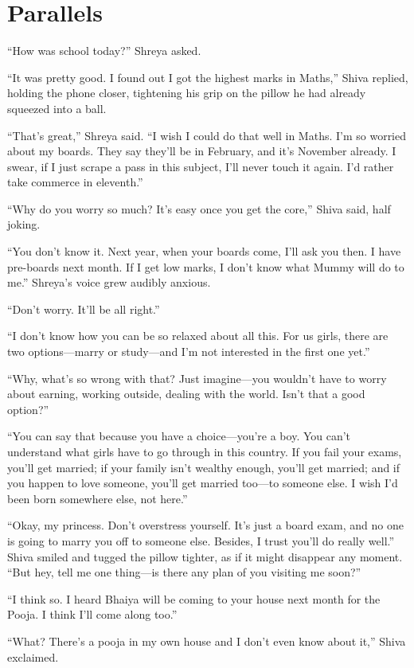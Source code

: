 \chapter{Parallels}
``How was school today?'' Shreya asked.

``It was pretty good. I found out I got the highest marks in Maths,'' Shiva replied, holding the phone closer, tightening his grip on the pillow he had already squeezed into a ball.

``That's great,'' Shreya said. ``I wish I could do that well in Maths. I'm so worried about my boards. They say they'll be in February, and it's November already. I swear, if I just scrape a pass in this subject, I'll never touch it again. I'd rather take commerce in eleventh.''

``Why do you worry so much? It's easy once you get the core,'' Shiva said, half joking.

``You don't know it. Next year, when your boards come, I'll ask you then. I have pre-boards next month. If I get low marks, I don't know what Mummy will do to me.'' Shreya's voice grew audibly anxious.

``Don't worry. It'll be all right.''

``I don't know how you can be so relaxed about all this. For us girls, there are two options—marry or study—and I'm not interested in the first one yet.''

``Why, what's so wrong with that? Just imagine—you wouldn't have to worry about earning, working outside, dealing with the world. Isn't that a good option?''

``You can say that because you have a choice—you're a boy. You can't understand what girls have to go through in this country. If you fail your exams, you'll get married; if your family isn't wealthy enough, you'll get married; and if you happen to love someone, you'll get married too—to someone else. I wish I'd been born somewhere else, not here.''

``Okay, my princess. Don't overstress yourself. It's just a board exam, and no one is going to marry you off to someone else. Besides, I trust you'll do really well.'' Shiva smiled and tugged the pillow tighter, as if it might disappear any moment. ``But hey, tell me one thing—is there any plan of you visiting me soon?''

``I think so. I heard Bhaiya will be coming to your house next month for the Pooja. I think I'll come along too.''

``What? There's a pooja in my own house and I don't even know about it,'' Shiva exclaimed.

